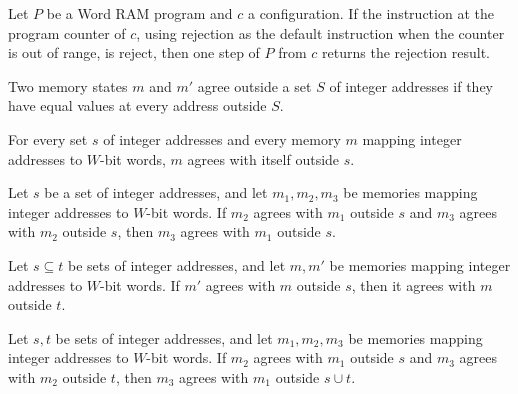 \begin{theorem}
\label{WordRAM.step_reject}
\leanok
{}
Let $P$ be a Word RAM program and $c$ a configuration. If the instruction at the program
counter of $c$, using rejection as the default instruction when the counter is out of
range, is reject, then one step of $P$ from $c$ returns the rejection result.
\end{theorem}

\begin{definition}
\label{WordRAM.AgreeOutside}
\leanok
Two memory states $m$ and $m'$ agree outside a set $S$ of integer addresses if they have
equal values at every address outside $S$.
\end{definition}

\begin{theorem}
\label{WordRAM.AgreeOutside.refl}
\leanok
{}
For every set $s$ of integer addresses and every memory $m$ mapping integer addresses to
$W$-bit words, $m$ agrees with itself outside $s$.
\end{theorem}

\begin{theorem}
\label{WordRAM.AgreeOutside.trans}
\leanok
{}
Let $s$ be a set of integer addresses, and let $m_1,m_2,m_3$ be memories mapping integer
addresses to $W$-bit words. If $m_2$ agrees with $m_1$ outside $s$ and $m_3$ agrees with
$m_2$ outside $s$, then $m_3$ agrees with $m_1$ outside $s$.
\end{theorem}

\begin{theorem}
\label{WordRAM.AgreeOutside.mono}
\leanok
{}
Let $s\subseteq t$ be sets of integer addresses, and let $m,m'$ be memories mapping
integer addresses to $W$-bit words. If $m'$ agrees with $m$ outside $s$, then it agrees
with $m$ outside $t$.
\end{theorem}

\begin{theorem}
\label{WordRAM.AgreeOutside.trans_union}
\leanok
{}
Let $s,t$ be sets of integer addresses, and let $m_1,m_2,m_3$ be memories mapping
integer addresses to $W$-bit words. If $m_2$ agrees with $m_1$ outside $s$ and $m_3$
agrees with $m_2$ outside $t$, then $m_3$ agrees with $m_1$ outside $s\cup t$.
\end{theorem}

